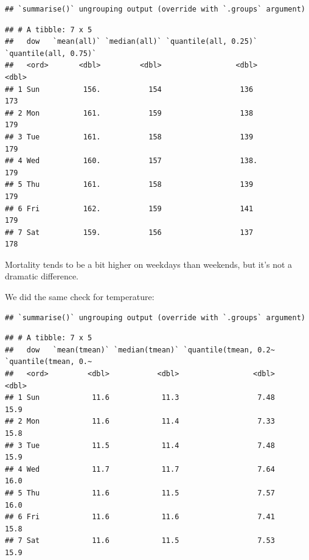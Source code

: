 \documentclass[
]{book}
\newenvironment{Shaded}{\begin{snugshade}}{\end{snugshade}}
\newcommand{\FloatTok}[1]{\textcolor[rgb]{0.00,0.00,0.81}{#1}}
\newcommand{\KeywordTok}[1]{\textcolor[rgb]{0.13,0.29,0.53}{\textbf{#1}}}
\newcommand{\NormalTok}[1]{#1}
\newcommand{\OperatorTok}[1]{\textcolor[rgb]{0.81,0.36,0.00}{\textbf{#1}}}
\newcommand{\StringTok}[1]{\textcolor[rgb]{0.31,0.60,0.02}{#1}}
\begin{document}
\begin{verbatim}
## `summarise()` ungrouping output (override with `.groups` argument)
\end{verbatim}

\begin{verbatim}
## # A tibble: 7 x 5
##   dow   `mean(all)` `median(all)` `quantile(all, 0.25)` `quantile(all, 0.75)`
##   <ord>       <dbl>         <dbl>                 <dbl>                 <dbl>
## 1 Sun          156.           154                  136                    173
## 2 Mon          161.           159                  138                    179
## 3 Tue          161.           158                  139                    179
## 4 Wed          160.           157                  138.                   179
## 5 Thu          161.           158                  139                    179
## 6 Fri          162.           159                  141                    179
## 7 Sat          159.           156                  137                    178
\end{verbatim}

Mortality tends to be a bit higher on weekdays than weekends, but it's not
a dramatic difference.

We did the same check for temperature:

\begin{Shaded}
\end{Shaded}

\begin{verbatim}
## `summarise()` ungrouping output (override with `.groups` argument)
\end{verbatim}

\begin{verbatim}
## # A tibble: 7 x 5
##   dow   `mean(tmean)` `median(tmean)` `quantile(tmean, 0.2~ `quantile(tmean, 0.~
##   <ord>         <dbl>           <dbl>                 <dbl>                <dbl>
## 1 Sun            11.6            11.3                  7.48                 15.9
## 2 Mon            11.6            11.4                  7.33                 15.8
## 3 Tue            11.5            11.4                  7.48                 15.9
## 4 Wed            11.7            11.7                  7.64                 16.0
## 5 Thu            11.6            11.5                  7.57                 16.0
## 6 Fri            11.6            11.6                  7.41                 15.8
## 7 Sat            11.6            11.5                  7.53                 15.9
\end{verbatim}
\end{document}
